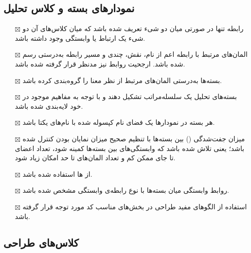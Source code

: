 \subsection{\hspace*{0.2cm}نمودارهای بسته و کلاس تحلیل}

\begin{itemize} \setlength\itemsep{0cm}
	\item[$\boxtimes$]
	رابطه  تنها در صورتی میان دو شیء تعریف شده باشد که میان کلاس‌های آن دو شیء یک ارتباط یا وابستگی وجود داشته باشد.
	\item[$\boxtimes$]
	المان‌های مرتبط با رابطه  اعم از نام، نقش، چندی و مسیر رابطه به‌درستی رسم شده باشد. ارجحیت روابط نیز مدنظر قرار گرفته شده باشد.
	\item[$\boxtimes$]
	بسته‌ها به‌درستی المان‌های مرتبط از نظر معنا را گروه‌بندی کرده باشد.
	\item[$\boxtimes$]
	بسته‌های تحلیل یک سلسله‌مراتب تشکیل دهند و با توجه به مفاهیم موجود در خود لایه‌بندی شده باشد.
	\item[$\boxtimes$]
	هر بسته در نمودارها یک فضای نام کپسوله شده با نام‌های یکتا باشد.
	\item[$\boxtimes$]
	میزان جفت‌شدگی () بین بسته‌ها با تنظیم صحیح میزان نمایان بودن کنترل شده باشد؛ یعنی تلاش شده باشد که وابستگی‌های بین بسته‌ها کمینه شود، تعداد اعضای  تا جای ممکن کم و تعداد المان‌های  تا حد امکان زیاد شود.
	\item[$\boxtimes$]
	از ها استفاده‌ شده باشد.
	\item[$\boxtimes$]
	روابط وابستگی میان بسته‌ها با نوع رابطه‌ی وابستگی مشخص شده باشد.
	\item[$\boxtimes$]
	استفاده از الگوهای مفید طراحی در بخش‌های مناسب کد مورد توجه قرار گرفته باشد.

\end{itemize}

\subsection{\hspace*{0.2cm}کلاس‌های طراحی}


